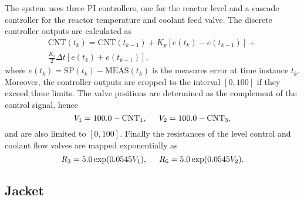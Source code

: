 \documentclass[10pt, conference, compsocconf]{IEEEtran}
\begin{document}
The system uses three PI controllers, one for the reactor level
and a cascade controller for the reactor temperature and coolant feed valve.
The discrete controller outputs are calculated as
\begin{align*}
\text{CNT}(t_{k}) = \text{CNT}(t_{k-1})+K_{p}
	\left[e(t_{k})-e(t_{k-1})\right]+\nonumber \\
	\frac{K_{i}}{2}\Delta t\left[e(t_{k})+e(t_{k-1})\right],
\label{eq:CNT}
\end{align*}
where $e(t_{k})=\text{SP}(t_{k})-\text{MEAS}(t_{k})$ is
the measures error at time instance $t_{k}$.
Moreover, the controller outputs are cropped to the interval $[0,100]$
if they exceed these limits.
The valve positions are determined as the complement of the control
signal, hence
\begin{equation*}
V_{1} = 100.0 - \text{CNT}_{1}, \hspace{0.5cm} V_{2} = 100.0 - \text{CNT}_{3},
\label{eq:Valvepos}
\end{equation*}
and are also limited to $[0,100]$.
Finally the resistances of the level control and coolant flow
valves are mapped exponentially as
\begin{equation*}
R_{3} = 5.0 \exp(0.0545 V_{1}), \hspace{0.5cm} R_{6} =5.0 \exp(0.0545 V_{2}).
\label{eq:Valveres}
\end{equation*}


\subsection{Jacket}\label{appendix:jacketmodeleq}
\end{document}
